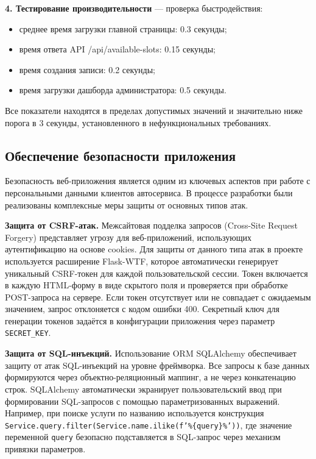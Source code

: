\documentclass[14pt,a4paper,oneside]{extarticle}
\begin{document}
\textbf{4. Тестирование производительности} --- проверка быстродействия:
\begin{itemize}[leftmargin=2cm]
    \item среднее время загрузки главной страницы: 0.3 секунды;
    \item время ответа API /api/available-slots: 0.15 секунды;
    \item время создания записи: 0.2 секунды;
    \item время загрузки дашборда администратора: 0.5 секунды.
\end{itemize}

Все показатели находятся в пределах допустимых значений и значительно ниже порога в 3 секунды, установленного в нефункциональных требованиях.

\subsection{Обеспечение безопасности приложения}

Безопасность веб-приложения является одним из ключевых аспектов при работе с персональными данными клиентов автосервиса. В процессе разработки были реализованы комплексные меры защиты от основных типов атак.

\textbf{Защита от CSRF-атак.} Межсайтовая подделка запросов (Cross-Site Request Forgery) представляет угрозу для веб-приложений, использующих аутентификацию на основе cookies. Для защиты от данного типа атак в проекте используется расширение Flask-WTF, которое автоматически генерирует уникальный CSRF-токен для каждой пользовательской сессии. Токен включается в каждую HTML-форму в виде скрытого поля и проверяется при обработке POST-запроса на сервере. Если токен отсутствует или не совпадает с ожидаемым значением, запрос отклоняется с кодом ошибки 400. Секретный ключ для генерации токенов задаётся в конфигурации приложения через параметр \texttt{SECRET\_KEY}.

\textbf{Защита от SQL-инъекций.} Использование ORM SQLAlchemy обеспечивает защиту от атак SQL-инъекций на уровне фреймворка. Все запросы к базе данных формируются через объектно-реляционный маппинг, а не через конкатенацию строк. SQLAlchemy автоматически экранирует пользовательский ввод при формировании SQL-запросов с помощью параметризованных выражений. Например, при поиске услуги по названию используется конструкция \texttt{Service.query.filter(Service.name.ilike(f'\%\{query\}\%'))}, где значение переменной \texttt{query} безопасно подставляется в SQL-запрос через механизм привязки параметров.
\end{document}

